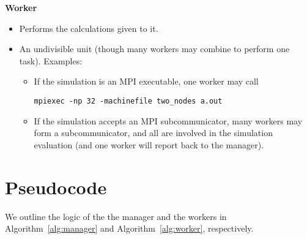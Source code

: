 \documentclass{article}
\newcommand{\algref}[1]{{\rm Algorithm}~\ref{alg:#1}}
\begin{document}
\noindent \textbf{Worker}
\begin{itemize}
  \item Performs the calculations given to it.
  \item An undivisible unit (though many workers may combine to perform one task). Examples:
    \begin{itemize}
      \item If the simulation is an MPI executable, one worker may call 
        \begin{center}
          \texttt{mpiexec -np 32 -machinefile two\_nodes a.out}
        \end{center}
      \item If the simulation accepts an MPI subcommunicator, many workers may
        form a subcommunicator, and all are involved in the simulation
        evaluation (and one worker will report back to the manager).
    \end{itemize}
\end{itemize}


\section{Pseudocode}

We outline the logic of the the manager and the workers in \algref{manager} and \algref{worker}, respectively.
\end{document}
